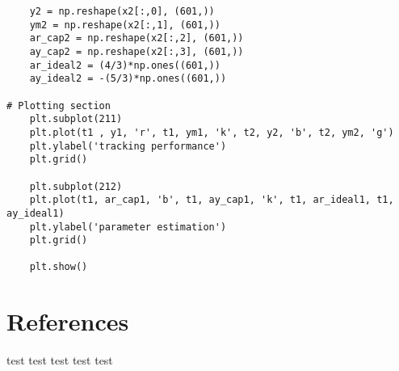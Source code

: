 \documentclass{article}
\begin{document}
\begin{lstlisting}
    y2 = np.reshape(x2[:,0], (601,))
    ym2 = np.reshape(x2[:,1], (601,))
    ar_cap2 = np.reshape(x2[:,2], (601,))
    ay_cap2 = np.reshape(x2[:,3], (601,))
    ar_ideal2 = (4/3)*np.ones((601,))
    ay_ideal2 = -(5/3)*np.ones((601,))

# Plotting section
    plt.subplot(211)
    plt.plot(t1 , y1, 'r', t1, ym1, 'k', t2, y2, 'b', t2, ym2, 'g')
    plt.ylabel('tracking performance')
    plt.grid()

    plt.subplot(212)
    plt.plot(t1, ar_cap1, 'b', t1, ay_cap1, 'k', t1, ar_ideal1, t1, ay_ideal1)
    plt.ylabel('parameter estimation')
    plt.grid()

    plt.show()
\end{lstlisting}


\section{References}
\cite{ruiter} test
\cite{dirac} test
\cite{Markley} test
\cite{einstein} test
\cite{knuth-fa} test
\medskip
\printbibliography
\end{document}
